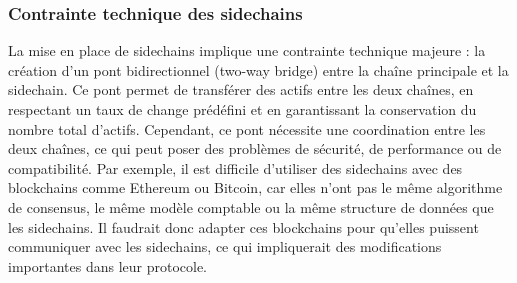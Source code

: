 \subsubsection{Contrainte technique des sidechains}

La mise en place de sidechains implique une contrainte technique majeure : la création d'un pont bidirectionnel (two-way bridge) entre la chaîne principale et la sidechain. Ce pont permet de transférer des actifs entre les deux chaînes, en respectant un taux de change prédéfini et en garantissant la conservation du nombre total d'actifs. Cependant, ce pont nécessite une coordination entre les deux chaînes, ce qui peut poser des problèmes de sécurité, de performance ou de compatibilité. Par exemple, il est difficile d'utiliser des sidechains avec des blockchains comme Ethereum ou Bitcoin, car elles n'ont pas le même algorithme de consensus, le même modèle comptable ou la même structure de données que les sidechains. Il faudrait donc adapter ces blockchains pour qu'elles puissent communiquer avec les sidechains, ce qui impliquerait des modifications importantes dans leur protocole.